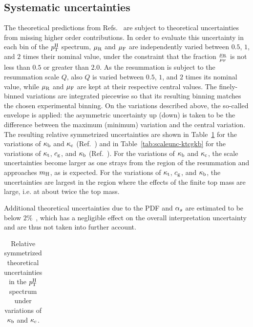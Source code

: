\subsection{Systematic uncertainties}

The theoretical predictions from Refs.~\cite{Bishara:2016jga,Grazzini:2017szg,Grazzini:2016paz} are subject to theoretical uncertainties from missing higher order contributions.
% 
In order to evaluate this uncertainty in each bin of the $p_\mathrm{T}^\mathrm{H}$ spectrum, $\mu_\mathrm{R}$ and $\mu_\mathrm{F}$ are independently varied between $0.5$, $1$, and $2$ times their nominal value, under the constraint that the fraction $\frac{\mu_\mathrm{R}}{\mu_\mathrm{F}}$ is not less than $0.5$ or greater than $2.0$.
% 
As the resummation is subject to the resummation scale $Q$, also $Q$ is varied between $0.5$, $1$, and $2$ times its nominal value, while $\mu_\mathrm{R}$ and $\mu_\mathrm{F}$ are kept at their respective central values.
% 
The finely-binned variations are integrated piecewise so that its resulting binning matches the chosen experimental binning.
% 
On the variations described above, the so-called envelope is applied: the asymmetric uncertainty up (down) is taken to be the difference between the maximum (minimum) variation and the central variation.
% 
The resulting relative symmetrized uncertainties are shown in Table~\ref{tab:scaleunc-kbkc} for the variations of $\kappa_{\mathrm{b}}$ and $\kappa_{\mathrm{c}}$ (Ref.~\cite{Bishara:2016jga}) and in Table~\ref{tab:scaleunc-ktcgkb} for the variations of $\kappa_{\mathrm{t}}$, $c_\mathrm{g}$, and $\kappa_{\mathrm{b}}$ (Ref.~\cite{Grazzini:2017szg,Grazzini:2016paz}).
% 
For the variations of $\kappa_{\mathrm{b}}$ and $\kappa_{\mathrm{c}}$, the scale uncertainties become larger as one strays from the region of the resummation and approaches $m_{\mathrm{H}}$, as is expected.
% 
For the variations of $\kappa_{\mathrm{t}}$, $c_\mathrm{g}$, and $\kappa_{\mathrm{b}}$, the uncertainties are largest in the region where the effects of the finite top mass are large, i.e. at about twice the top mass.


Additional theoretical uncertainties due to the PDF and $\alpha_s$ are estimated to be below $2\%$~\cite{Bishara:2016jga}, which has a negligible effect on the overall interpretation uncertainty and are thus not taken into further account.



\begin{table}[htb]
\caption{
    Relative symmetrized theoretical uncertainties in the $p_\mathrm{T}^\mathrm{H}$ spectrum under variations of $\kappa_{\mathrm{b}}$ and $\kappa_{\mathrm{c}}$.
    }
\label{tab:scaleunc-kbkc}
\footnotesize
\begin{center}
\begin{tabular}{lccccc}
\hline

\hline
\end{tabular}
\end{center}
\end{table}

